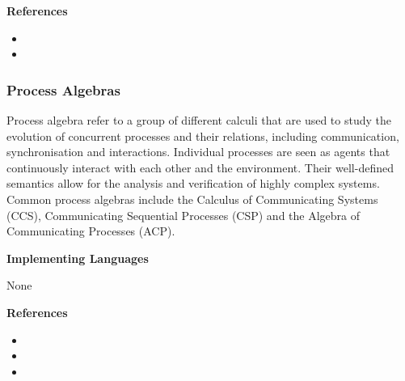 

\textbf{References}
\begin{itemize}
	
\item {}
	
\item {}
\end{itemize}



\subsubsection{Process Algebras}
\label{subsecF:ProcessAlgebras}


Process algebra refer to a group of different calculi that are used to study the evolution of concurrent processes and their relations, including communication, synchronisation and interactions.
Individual processes are seen as agents that continuously interact with each other and the environment.
Their well-defined semantics allow for the analysis and verification of highly complex systems. 
Common process algebras include the Calculus of Communicating Systems (CCS), Communicating Sequential Processes (CSP) and the Algebra of Communicating Processes (ACP).

\textbf{Implementing Languages}

None




\itemCpsUsage {}

\itemCpsUsage {}

\itemCpsUsage {}


\textbf{References}
\begin{itemize}
	
\item {}
	
\item {}
	
\item {}
\end{itemize}



